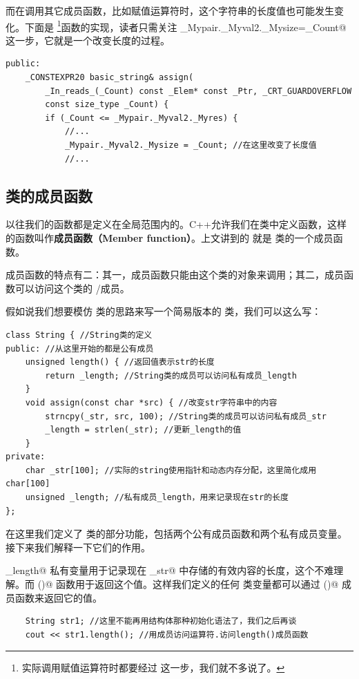 而在调用其它成员函数，比如赋值运算符时，这个字符串的长度值也可能发生变化。下面是 \lstinline@assign@\footnote{实际调用赋值运算符时都要经过 \lstinline@assign@ 这一步，我们就不多说了。}函数的实现，读者只需关注 \lstinline@_Mypair._Myval2._Mysize=_Count@ 这一步，它就是一个改变长度的过程。
\begin{lstlisting}
public:
    _CONSTEXPR20 basic_string& assign(
        _In_reads_(_Count) const _Elem* const _Ptr, _CRT_GUARDOVERFLOW
        const size_type _Count) {
        if (_Count <= _Mypair._Myval2._Myres) {
            //...
            _Mypair._Myval2._Mysize = _Count; //在这里改变了长度值
            //...
\end{lstlisting}
\subsection*{类的成员函数}
以往我们的函数都是定义在全局范围内的。C++允许我们在类中定义函数，这样的函数叫作\textbf{成员函数（Member function）}。上文讲到的 \lstinline@length@ 就是 \lstinline@string@ 类的一个成员函数。\par
成员函数的特点有二：其一，成员函数只能由这个类的对象来调用；其二，成员函数可以访问这个类的 \lstinline@protected@/\lstinline@private@ 成员。\par
假如说我们想要模仿 \lstinline@string@ 类的思路来写一个简易版本的 \lstinline@String@ 类，我们可以这么写：
\begin{lstlisting}
class String { //String类的定义
public: //从这里开始的都是公有成员
    unsigned length() { //返回值表示str的长度
        return _length; //String类的成员可以访问私有成员_length
    }
    void assign(const char *src) { //改变str字符串中的内容
        strncpy(_str, src, 100); //String类的成员可以访问私有成员_str
        _length = strlen(_str); //更新_length的值
    }
private:
    char _str[100]; //实际的string使用指针和动态内存分配，这里简化成用char[100]
    unsigned _length; //私有成员_length，用来记录现在str的长度
};
\end{lstlisting}
在这里我们定义了 \lstinline@String@ 类的部分功能，包括两个公有成员函数和两个私有成员变量。接下来我们解释一下它们的作用。\par
\lstinline@_length@ 私有变量用于记录现在 \lstinline@_str@ 中存储的有效内容的长度，这个不难理解。而 \lstinline@length()@ 函数用于返回这个值。这样我们定义的任何 \lstinline@String@ 类变量都可以通过 \lstinline@length()@ 成员函数来返回它的值。
\begin{lstlisting}
    String str1; //这里不能再用结构体那种初始化语法了，我们之后再谈
    cout << str1.length(); //用成员访问运算符.访问length()成员函数
\end{lstlisting}
